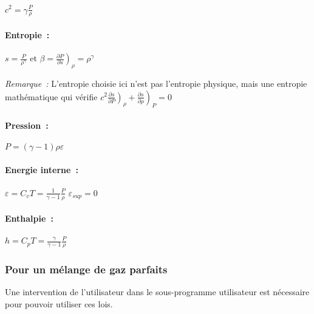 $c^2 = \gamma \displaystyle\frac{P}{\rho}$


\paragraph{Entropie~:}

$s = \displaystyle\frac{P}{\rho^{\gamma}}$
\quad et
$\beta = \left.\displaystyle\frac{\partial P}{\partial s}\right)_{\rho}
= \rho^{\gamma}$

\noindent\textit{Remarque~:} L'entropie choisie ici n'est pas l'entropie
physique, mais une entropie math\'ematique qui v\'erifie \quad
$c^2 \left.\displaystyle\frac{\partial s}{\partial P}\right)_{\rho}
+ \left.\displaystyle\frac{\partial s}{\partial \rho}\right)_{P} = 0$


\paragraph{Pression~:}

$P = (\gamma-1) \rho \varepsilon$


\paragraph{Energie interne~:}

$\varepsilon = C_v T
= \displaystyle\frac{1}{\gamma-1} \displaystyle\frac{P}{\rho}$\qquad{}
$\varepsilon_{sup} = 0$

\paragraph{Enthalpie~:}

$h = C_p T
= \displaystyle\frac{\gamma}{\gamma-1} \displaystyle\frac{P}{\rho}$


\subsubsection*{Pour un m\'elange de gaz parfaits}

Une intervention de l'utilisateur dans le sous-programme utilisateur
 est nécessaire pour pouvoir utiliser ces lois.

